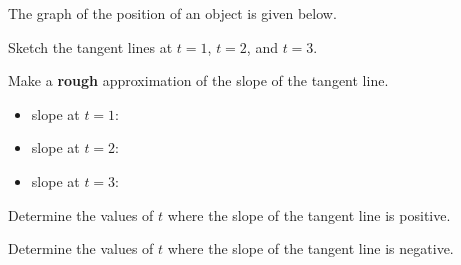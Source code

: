 \begin{problem}
\item The graph of the position of an object is given below.

  \scalebox{0.6}{}

  \begin{subproblem}
  \item Sketch the tangent lines at $t=1$, $t=2$, and $t=3$.
  \item Make a \textbf{rough} approximation of the slope of the tangent line.
    \begin{itemize}
    \item slope at $t=1$:
    \item slope at $t=2$:
    \item slope at $t=3$:
    \end{itemize}
  \item Determine the values of $t$ where the slope of the tangent line is positive.
    \vfill
  \item Determine the values of $t$ where the slope of the tangent line is negative.
    \vfill
  \end{subproblem}

\end{problem}


